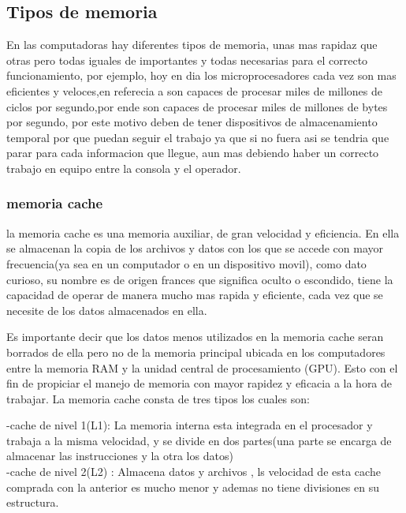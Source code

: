 \documentclass{article}
\begin{document}
    \subsection{Tipos de memoria}
    En las computadoras hay diferentes tipos de memoria, unas mas rapidaz que otras pero todas iguales de importantes y todas necesarias para el correcto funcionamiento, por ejemplo, hoy en dia los microprocesadores cada vez son mas eficientes y veloces,en referecia a \cite{profe} son  capaces de procesar miles de millones de ciclos por segundo,por ende son capaces de procesar miles de millones de bytes por segundo, por este motivo deben de tener dispositivos de almacenamiento temporal por que puedan seguir el trabajo ya que si no fuera asi se tendria que parar para cada informacion que llegue, aun mas debiendo haber un correcto trabajo en equipo entre la consola y el operador.
    
        \subsubsection{memoria cache}
        la memoria cache es una memoria auxiliar, de gran velocidad y eficiencia. En ella se almacenan la copia de los archivos y datos con los que se accede con mayor frecuencia(ya sea en un computador o en un dispositivo movil),
        como dato curioso, su nombre es de origen frances que significa oculto o escondido, tiene la capacidad de operar de manera mucho mas rapida y eficiente, cada vez que se necesite de los datos almacenados en ella.\cite{academia1}
        
        Es importante decir que los datos menos utilizados en la memoria cache seran borrados de ella pero no de la memoria principal
        ubicada en los computadores entre la memoria RAM y la unidad central de procesamiento (GPU). Esto con el fin de propiciar el manejo de memoria con mayor rapidez y eficacia a la hora de trabajar.
        La memoria cache consta de tres tipos los cuales son:
            
           
            -cache de nivel 1(L1): La memoria interna  esta integrada en el procesador y trabaja a la misma velocidad, y se divide en dos partes(una parte se encarga de almacenar las instrucciones y la otra los datos)\\
            
            
            -cache de nivel 2(L2) : Almacena datos y archivos , ls velocidad de esta cache comprada con la anterior es mucho menor y ademas no tiene divisiones en su estructura.\\
            
\end{document}
